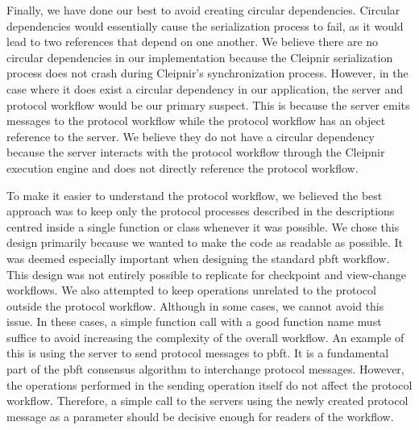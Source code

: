 Finally, we have done our best to avoid creating circular dependencies. Circular dependencies would essentially cause the serialization process to fail, as it would lead to two references that depend on one another. We believe there are no circular dependencies in our implementation because the Cleipnir serialization process does not crash during Cleipnir's synchronization process. However, in the case where it does exist a circular dependency in our application, the server and protocol workflow would be our primary suspect. This is because the server emits messages to the protocol workflow while the protocol workflow has an object reference to the server. We believe they do not have a circular dependency because the server interacts with the protocol workflow through the Cleipnir execution engine and does not directly reference the protocol workflow.

To make it easier to understand the protocol workflow, we believed the best approach was to keep only the protocol processes described in the descriptions centred inside a single function or class whenever it was possible. We chose this design primarily because we wanted to make the code as readable as possible. It was deemed especially important when designing the standard \ac{pbft} workflow. This design was not entirely possible to replicate for checkpoint and view-change workflows. We also attempted to keep operations unrelated to the protocol outside the protocol workflow. Although in some cases, we cannot avoid this issue. In these cases, a simple function call with a good function name must suffice to avoid increasing the complexity of the overall workflow.
An example of this is using the server to send protocol messages to \ac{pbft}. It is a fundamental part of the \ac{pbft} consensus algorithm to interchange protocol messages. However, the operations performed in the sending operation itself do not affect the protocol workflow. Therefore, a simple call to the servers  using the newly created protocol message as a parameter should be decisive enough for readers of the workflow. 

